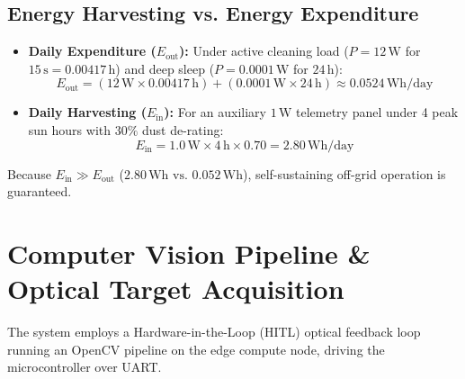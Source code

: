 \documentclass[10pt,a4paper]{article}
\begin{document}
\subsection{Energy Harvesting vs. Energy Expenditure}
\begin{itemize}[leftmargin=*]
    \item \textbf{Daily Expenditure ($E_{\text{out}}$):} Under active cleaning load ($P = 12\,\text{W}$ for $15\,\text{s} = 0.00417\,\text{h}$) and deep sleep ($P = 0.0001\,\text{W}$ for $24\,\text{h}$):
    \begin{equation}
        E_{\text{out}} = (12\,\text{W} \times 0.00417\,\text{h}) + (0.0001\,\text{W} \times 24\,\text{h}) \approx 0.0524\,\text{Wh/day}
    \end{equation}
    \item \textbf{Daily Harvesting ($E_{\text{in}}$):} For an auxiliary $1\,\text{W}$ telemetry panel under 4 peak sun hours with $30\%$ dust de-rating:
    \begin{equation}
        E_{\text{in}} = 1.0\,\text{W} \times 4\,\text{h} \times 0.70 = 2.80\,\text{Wh/day}
    \end{equation}
\end{itemize}
Because $E_{\text{in}} \gg E_{\text{out}}$ ($2.80\,\text{Wh} \text{ vs. } 0.052\,\text{Wh}$), self-sustaining off-grid operation is guaranteed.

\clearpage

\section{Computer Vision Pipeline \& Optical Target Acquisition}

The system employs a Hardware-in-the-Loop (HITL) optical feedback loop running an OpenCV pipeline on the edge compute node, driving the microcontroller over UART.
\end{document}
